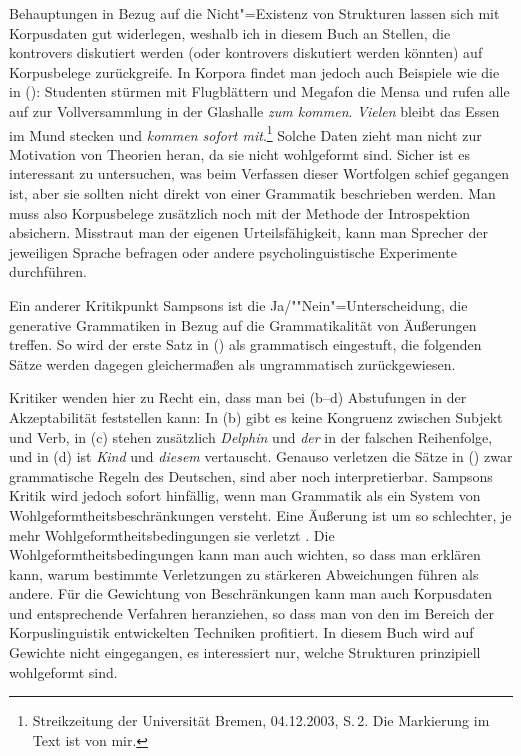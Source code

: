 Behauptungen in Bezug auf die Nicht"=Existenz von Strukturen lassen sich mit Korpusdaten gut widerlegen,
weshalb ich in diesem Buch an Stellen, die kontrovers diskutiert werden (oder kontrovers diskutiert
werden könnten) auf Korpusbelege zurückgreife. In Korpora findet man jedoch auch Beispiele wie die in ():
\ea
Studenten stürmen mit Flugblättern und Megafon die Mensa und rufen alle auf zur Vollversammlung
in der Glashalle \emph{zum kommen}. \emph{Vielen} bleibt das Essen im Mund stecken und \emph{kommen sofort mit}.\footnote{
  Streikzeitung der Universität Bremen, 04.12.2003, S.\,2. Die Markierung im Text ist von mir.%
}
\z
Solche Daten zieht man nicht zur Motivation von Theorien heran, da sie nicht wohlgeformt sind.
Sicher ist es interessant zu untersuchen, was beim Verfassen dieser Wortfolgen schief gegangen ist, aber
sie sollten nicht direkt von einer Grammatik beschrieben werden. Man muss also Korpusbelege zusätzlich
noch mit der Methode der Introspektion absichern. Misstraut man der eigenen Urteilsfähigkeit, kann
man Sprecher der jeweiligen Sprache befragen oder andere psycholinguistische Experimente
durchführen.

\begin{sloppypar}
Ein anderer Kritikpunkt Sampsons ist die Ja/""Nein"=Unterscheidung, die generative Grammatiken in Bezug
auf die Grammatikalität von Äußerungen treffen. So wird der erste Satz in () als grammatisch eingestuft,
die folgenden Sätze werden dagegen gleichermaßen als ungrammatisch zurückgewiesen.
\end{sloppypar}

\eal
{}
\zl
Kritiker wenden hier zu Recht ein, dass man bei (b--d) Abstufungen in der Akzeptabilität
feststellen kann: In (b) gibt es keine Kongruenz zwischen Subjekt und Verb, in (c)
stehen zusätzlich \emph{Delphin} und \emph{der} in der falschen Reihenfolge, und in (d) ist \emph{Kind}
und \emph{diesem} vertauscht. Genauso verletzen die Sätze in () zwar grammatische
Regeln des Deutschen, sind aber noch interpretierbar.
Sampsons Kritik wird jedoch sofort hinfällig, wenn man Grammatik als ein System
von Wohlgeformtheitsbeschränkungen versteht. Eine Äußerung ist um so schlechter,
je mehr Wohlgeformtheitsbedingungen sie verletzt \citep[--27]{PS2001a}. Die
Wohlgeformtheitsbedingungen kann man auch wichten, 
so dass man erklären kann, warum bestimmte Verletzungen zu stärkeren Abweichungen führen als andere.
Für die Gewichtung von Beschränkungen kann man auch Korpusdaten und entsprechende Verfahren
heranziehen, so dass man von den im Bereich der Korpuslinguistik entwickelten Techniken profitiert.
In diesem Buch wird auf Gewichte nicht eingegangen, es interessiert nur, welche Strukturen prinzipiell wohlgeformt sind.






